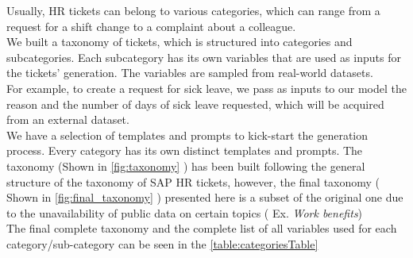 Usually, HR tickets can belong to various categories, which can range from a request for a shift change to a complaint about a colleague. \\
We built a taxonomy of tickets, which is structured into categories and subcategories. Each subcategory has its own variables that are used as inputs for the tickets' generation. The variables are sampled from real-world datasets. \\
For example, to create a request for sick leave, we pass as inputs to our model the reason and the number of days of sick leave requested, which will be acquired from an external dataset. \\
We have a selection of templates and prompts to kick-start the generation process. Every category has its own distinct templates and prompts. The taxonomy (Shown in \autoref{fig:taxonomy} ) has been built following the general structure of the taxonomy of SAP HR tickets, however, the final taxonomy ( Shown in \autoref{fig:final_taxonomy} ) presented here is a subset of the original one due to the unavailability of public data on certain topics ( Ex. \textit{Work benefits}) \\ The final complete taxonomy and the complete list of all variables used for each category/sub-category can be seen in the \autoref{table:categoriesTable}


\begin{table}[h]
\caption{Table of all defined categories and sub-categories with their respective variables}\label{table:categoriesTable}
\end{table}